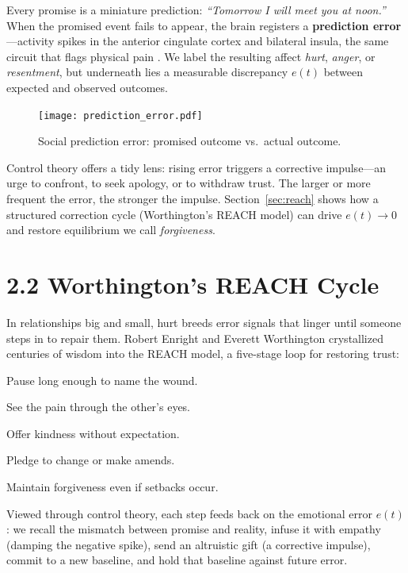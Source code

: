 \documentclass{book}       %
\begin{document}
Every promise is a miniature prediction:  
\emph{“Tomorrow I will meet you at noon.”}  
When the promised event fails to appear, the brain registers a
\textbf{prediction error}—activity spikes in the anterior cingulate
cortex and bilateral insula, the same circuit that flags physical pain
\cite{Eisenberger2003_SocialPain,Holroyd2002_RPE}.  
We label the resulting affect \emph{hurt}, \emph{anger}, or
\emph{resentment}, but underneath lies a measurable discrepancy
$e(t)$ between expected and observed outcomes.

\begin{figure}[h]
  \centering
  \texttt{[image: prediction\_error.pdf]}
  \caption{Social prediction error: promised outcome vs.\ actual outcome.}
\end{figure}

Control theory offers a tidy lens: rising error triggers a corrective
impulse—an urge to confront, to seek apology, or to withdraw trust.
The larger or more frequent the error, the stronger the impulse.
Section~\ref{sec:reach} shows how a structured correction cycle
(Worthington’s REACH model) can drive $e(t)\rightarrow 0$ and
restore equilibrium we call \emph{forgiveness}.



\section*{2.2  Worthington’s REACH Cycle}
\label{sec:reach}

In relationships big and small, hurt breeds error signals that linger until someone steps in to repair them.  
Robert Enright and Everett Worthington crystallized centuries of wisdom into the REACH model, a five-stage loop for restoring trust:

\begin{description}[noitemsep]
  \item[\textbf{R}ecall]  Pause long enough to name the wound.  
  \item[\textbf{E}mpathize]  See the pain through the other’s eyes.  
  \item[\textbf{A}ltruistic Gift]  Offer kindness without expectation.  
  \item[\textbf{C}ommit]  Pledge to change or make amends.  
  \item[\textbf{H}old]  Maintain forgiveness even if setbacks occur.  
\end{description}

Viewed through control theory, each step feeds back on the emotional error $e(t)$:  
we recall the mismatch between promise and reality, infuse it with empathy (damping the negative spike),  
send an altruistic gift (a corrective impulse), commit to a new baseline, and hold that baseline against future error.
\end{document}
